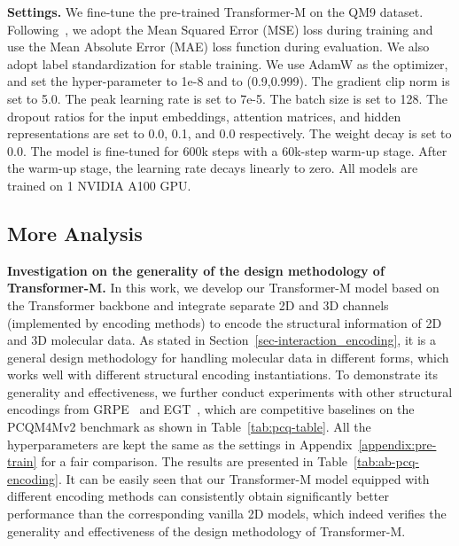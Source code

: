 \documentclass{article} \usepackage[dvipsnames]{xcolor}
\begin{document}
\textbf{Settings. } We fine-tune the pre-trained Transformer-M on the QM9 dataset. Following~\citet{tholke2021equivariant}, we adopt the Mean Squared Error (MSE) loss during training and use the Mean Absolute Error (MAE) loss function during evaluation. We also adopt label standardization for stable training. We use AdamW as the optimizer, and set the hyper-parameter  to 1e-8 and  to (0.9,0.999). The gradient clip norm is set to 5.0. The peak learning rate is set to 7e-5. The batch size is set to 128. The dropout ratios for the input embeddings, attention matrices, and hidden representations are set to 0.0, 0.1, and 0.0 respectively. The weight decay is set to 0.0. The model is fine-tuned for 600k steps with a 60k-step warm-up stage. After the warm-up stage, the learning rate decays linearly to zero. All models are trained on 1 NVIDIA A100 GPU.

\subsection{More Analysis}
\label{appendix-more-analysis}
\textbf{Investigation on the generality of the design methodology of Transformer-M.} In this work, we develop our Transformer-M model based on the Transformer backbone and integrate separate 2D and 3D channels (implemented by encoding methods) to encode the structural information of 2D and 3D molecular data. As stated in Section~\ref{sec-interaction_encoding}, it is a general design methodology for handling molecular data in different forms, which works well with different structural encoding instantiations. To demonstrate its generality and effectiveness, we further conduct experiments with other structural encodings from GRPE~\citep{park2022grpe} and EGT~\citep{hussain2022global}, which are competitive baselines on the PCQM4Mv2 benchmark as shown in Table~\ref{tab:pcq-table}. All the hyperparameters are kept the same as the settings in Appendix~\ref{appendix:pre-train} for a fair comparison. The results are presented in Table~\ref{tab:ab-pcq-encoding}. It can be easily seen that our Transformer-M model equipped with different encoding methods can consistently obtain significantly better performance than the corresponding vanilla 2D models, which indeed verifies the generality and effectiveness of the design methodology of Transformer-M.
\end{document}
